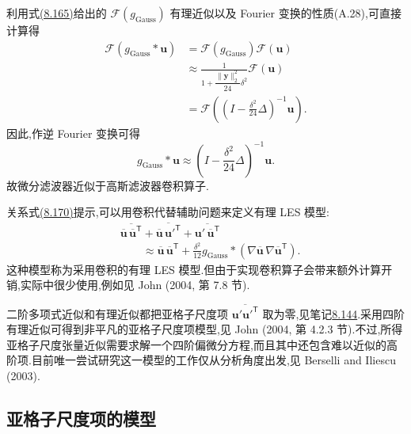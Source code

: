 \begin{note}[微分滤波器是卷积的近似]
\label{note:les-differential-filter-convolution-approximation}
利用式\hyperref[eq:les-rational-filter-expansion]{(8.165)}给出的 $\mathcal{F}(g_{\mathrm{Gauss}})$ 有理近似以及 Fourier 变换的性质(A.28),可直接计算得
\[
\begin{aligned}
 \mathcal{F}(g_{\mathrm{Gauss}}*\bm{u})
 &=\mathcal{F}(g_{\mathrm{Gauss}})
   \mathcal{F}(\bm{u})\\
 &\approx\frac{1}{1+\dfrac{\|\bm{y}\|_2^2}{24}\delta^2}
   \mathcal{F}(\bm{u})\\
 &=\mathcal{F}\!\left(
   \left(I-\frac{\delta^2}{24}\Delta\right)^{-1}
   \bm{u}\right).
\end{aligned}
\]
因此,作逆 Fourier 变换可得
\begin{equation}\label{eq:differential-filter-approximates-convolution}
 g_{\mathrm{Gauss}}*\bm{u}
 \approx\left(I-\frac{\delta^2}{24}\Delta\right)^{-1}
 \bm{u}.
\end{equation}
故微分滤波器近似于高斯滤波器卷积算子.

关系式\hyperref[eq:differential-filter-approximates-convolution]{(8.170)}提示,可以用卷积代替辅助问题来定义有理 LES 模型:
\[
\begin{aligned}
 &\overline{\overline{\bm{u}}\,
   \overline{\bm{u}}^{\mathsf T}}
  +\overline{\overline{\bm{u}}\,\bm{u}'^{\mathsf T}}
  +\overline{\bm{u}'\,\overline{\bm{u}}^{\mathsf T}}\\
 &\qquad\approx
  \overline{\bm{u}}\,
  \overline{\bm{u}}^{\mathsf T}
  +\frac{\delta^2}{12}
   g_{\mathrm{Gauss}}*
   \left(\nabla\overline{\bm{u}}\,
   \nabla\overline{\bm{u}}^{\mathsf T}\right).
\end{aligned}
\]
这种模型称为采用卷积的有理 LES 模型.但由于实现卷积算子会带来额外计算开销,实际中很少使用,例如见 John (2004, 第 7.8 节).
\end{note}

\begin{note}[四阶有理近似]
\label{note:les-fourth-order-rational-approximation}
二阶多项式近似和有理近似都把亚格子尺度项 $\overline{\bm{u}'\bm{u}'^{\mathsf T}}$ 取为零,见笔记\hyperref[note:les-second-order-fourier-sgs-term]{8.144}.采用四阶有理近似可得到非平凡的亚格子尺度项模型,见 John (2004, 第 4.2.3 节).不过,所得亚格子尺度张量近似需要求解一个四阶偏微分方程,而且其中还包含难以近似的高阶项.目前唯一尝试研究这一模型的工作仅从分析角度出发,见 Berselli and Iliescu (2003).
\end{note}
\subsection{亚格子尺度项的模型}
\label{subsec:les-subgrid-term-modeling}

